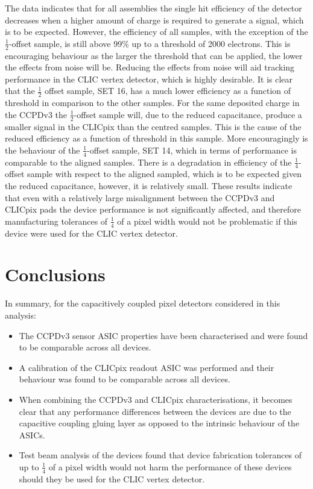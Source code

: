 The data indicates that for all assemblies the single hit efficiency of the detector decreases when a higher amount of charge is required to generate a signal, which is to be expected.  However, the efficiency of all samples, with the exception of the $\frac{1}{2}$-offset sample, is still above 99\% up to a threshold of 2000 electrons.  This is encouraging behaviour as the larger the threshold that can be applied, the lower the effects from noise will be.  Reducing the effects from noise will aid tracking performance in the CLIC vertex detector, which is highly desirable.  It is clear that the $\frac{1}{2}$ offset sample, SET 16, has a much lower efficiency as a function of threshold in comparison to the other samples.  For the same deposited charge in the CCPDv3 the $\frac{1}{2}$-offset sample will, due to the reduced capacitance, produce a smaller signal in the CLICpix than the centred samples.  This is the cause of the reduced efficiency as a function of threshold in this sample.  More encouragingly is the behaviour of the $\frac{1}{4}$-offset sample, SET 14, which in terms of performance is comparable to the aligned samples.  There is a degradation in efficiency of the $\frac{1}{4}$-offset sample with respect to the aligned sampled, which is to be expected given the reduced capacitance, however, it is relatively small.  These results indicate that even with a relatively large misalignment between the CCPDv3 and CLICpix pads the device performance is not significantly affected, and therefore manufacturing tolerances of $\frac{1}{4}$ of a pixel width would not be problematic if this device were used for the CLIC vertex detector.


\section{Conclusions}
In summary, for the capacitively coupled pixel detectors considered in this analysis:

\begin{itemize}
\item The CCPDv3 sensor ASIC properties have been characterised and were found to be comparable across all devices.
\item A calibration of the CLICpix readout ASIC was performed and their behaviour was found to be comparable across all devices.  
\item When combining the CCPDv3 and CLICpix characterisations, it becomes clear that any performance differences between the devices are due to the capacitive coupling gluing layer as opposed to the intrinsic behaviour of the ASICs.
\item Test beam analysis of the devices found that device fabrication tolerances of up to $\frac{1}{4}$ of a pixel width would not harm the performance of these devices should they be used for the CLIC vertex detector.  
\end{itemize}

